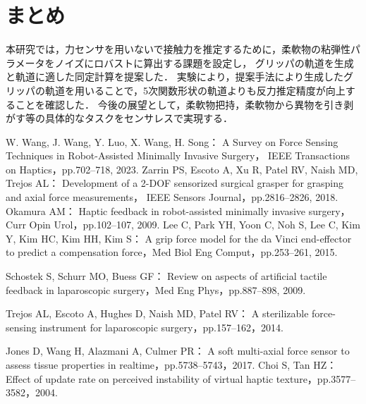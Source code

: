 \documentclass[a4paper]{jarticle}
\begin{document}
\section{まとめ}
本研究では，力センサを用いないで接触力を推定するために，柔軟物の粘弾性パラメータをノイズにロバストに算出する課題を設定し，
グリッパの軌道を生成と軌道に適した同定計算を提案した．
実験により，提案手法により生成したグリッパの軌道を用いることで，5次関数形状の軌道よりも反力推定精度が向上することを確認した．
今後の展望として，柔軟物把持，柔軟物から異物を引き剥がす等の具体的なタスクをセンサレスで実現する．
\begin{thebibliography}{9}
    \setlength{\itemsep}{0pt} %
    \renewcommand{\baselinestretch}{0.8}\selectfont %
    \setlength{\parskip}{0pt} %

    W. Wang, J. Wang, Y. Luo, X. Wang, H. Song：
    A Survey on Force Sensing Techniques in Robot-Assisted Minimally Invasive Surgery，
    IEEE Transactions on Haptics，pp.702–718, 2023.
    Zarrin PS, Escoto A, Xu R, Patel RV, Naish MD, Trejos AL： 
    Development of a 2-DOF sensorized surgical grasper for grasping and axial force measurements，
    IEEE Sensors Journal，pp.2816–2826, 2018.
    Okamura AM：
    Haptic feedback in robot-assisted minimally invasive surgery，Curr Opin Urol，pp.102–107, 2009.
    Lee C, Park YH, Yoon C, Noh S, Lee C, Kim Y, Kim HC, Kim HH, Kim S：
    A grip force model for the da Vinci end-effector to predict a compensation force，Med Biol Eng Comput，pp.253–261, 2015.

    Schostek S, Schurr MO, Buess GF：
    Review on aspects of artificial tactile feedback in laparoscopic surgery，Med Eng Phys，pp.887–898, 2009.

    Trejos AL, Escoto A, Hughes D, Naish MD, Patel RV：
    A sterilizable force-sensing instrument for laparoscopic surgery，pp.157–162，2014.

    Jones D, Wang H, Alazmani A, Culmer PR：
    A soft multi-axial force sensor to assess tissue properties in realtime，pp.5738–5743，2017.
    Choi S, Tan HZ：
    Effect of update rate on perceived instability of virtual haptic texture，pp.3577–3582，2004.


\end{thebibliography}
\end{document}
